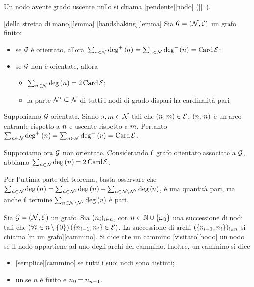 \begin{Definition}
  Un nodo avente grado uscente nullo si chiama
  [pendente][nodo]
  ([][]).
\end{Definition}
\begin{Lemma}
 [della stretta di mano][lemma]
  [handshaking][lemma]
  Sia $\mathcal{G} = (\mathcal{N},\mathcal{E})$ un grafo finito:
  \begin{itemize}
    \item se $\mathcal{G}$ \`e orientato, allora
      $\sum_{n \in \mathcal{N}} \text{deg}^+\left ( n \right )
      = \sum_{n \in \mathcal{N}} \text{deg}^-\left ( n \right )
      = \operatorname{Card}{\mathcal{E}}$;
    \item se $\mathcal{G}$ non \`e orientato, allora
      \begin{itemize}
        \item $\sum_{n \in \mathcal{N}} \text{deg}\left ( n \right )
          = 2\operatorname{Card}{\mathcal{E}}$;
        \item la parte $\mathcal{N}' \subseteq \mathcal{N}$ di tutti i nodi
          di grado dispari ha cardinalit\`a pari.
      \end{itemize}
  \end{itemize}
\end{Lemma}
\Proof Supponiamo $\mathcal{G}$ orientato. Siano
$n, m \in \mathcal{N}$ tali che
$(n,m) \in \mathcal{E}$:
$(n, m)$ \`e un arco entrante rispetto a
$n$ e uscente rispetto a $m$. Pertanto
$\sum_{n \in \mathcal{N}} \text{deg}^+\left ( n \right )
= \sum_{n \in \mathcal{N}} \text{deg}^-\left ( n \right )
= \operatorname{Card}{\mathcal{E}}$.
\par Supponiamo ora $\mathcal{G}$ non orientato.
Considerando il grafo orientato associato a $\mathcal{G}$, abbiamo
$\sum_{n \in \mathcal{N}} \text{deg}\left ( n \right )
= 2 \operatorname{Card}{\mathcal{E}}$.
\par Per l'ultima parte del teorema, basta osservare
che
$\sum_{n \in \mathcal{N}} \text{deg}\left ( n \right )
= \sum_{n \in \mathcal{N}'} \text{deg}\left ( n \right )
  + \sum_{n \in \mathcal{N} \setminus \mathcal{N} '} \text{deg}\left ( n \right )$,
\`e una quantit\`a pari, ma anche il termine
$\sum_{n \in \mathcal{N} \setminus \mathcal{N} '} \text{deg}\left ( n \right )$
\`e pari. \EndProof
\begin{Definition}
	Sia $\mathcal{G} = (\mathcal{N},\mathcal{E})$ un grafo. Sia $(n_i)_{i \in n}$,
  con $n \in \mathbb{N} \cup \lbrace \omega_0 \rbrace$ una successione di nodi tali che
  $\left ( \forall i \in n \setminus \lbrace 0 \rbrace \right ) \left ( \lbrace n_{i - 1},n_i \rbrace \in \mathcal{E} \right )$.
  La successione di archi
  $(\lbrace n_{i - 1}, n_i \rbrace)_{i \in n}$
  si chiama
  [in un grafo][cammino]. Si dice che un cammino
  [visitato][nodo] un nodo se il nodo appartiene ad uno
  degli archi del cammino. Inoltre, un cammino si dice
	\begin{itemize}
		\item {}[semplice][cammino] se tutti i suoi nodi sono
      distinti;
		\item un  se $n$ \`e finito e
      $n_0 = n_{n - 1}$.
	\end{itemize}
\end{Definition}
